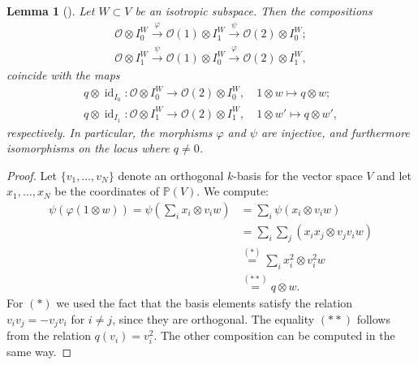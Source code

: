 \documentclass[a4paper, twoside, 11pt]{amsart}
\newtheorem{lemma}[theorem]{Lemma}
\theoremstyle{definition}
\theoremstyle{remark}
\numberwithin{equation}{theorem}
\DeclareMathOperator{\id}{id}
\begin{document}
\begin{lemma}[{\cite[§2]{Addington}}]\label{phi_and_psi_calc}
    Let $W\subset V$ be an isotropic subspace. Then the compositions 
    \begin{equation*}
    \begin{aligned}
    \mathcal{O} \otimes I_{0}^W \overset{\varphi}{\longrightarrow} \mathcal{O}(1) \otimes I_{1}^W \overset{\psi}{\longrightarrow} \mathcal{O}(2) \otimes I_{0}^W; \\
    \mathcal{O} \otimes I_{1}^W \overset{\psi}{\longrightarrow} \mathcal{O}(1) \otimes I_{0}^W \overset{\varphi}{\longrightarrow} \mathcal{O}(2) \otimes I_{1}^W,
    \end{aligned} 
    \end{equation*}
    coincide with the maps
    \begin{equation*}
    \begin{aligned}
         q \otimes \id_{I_0} \colon \mathcal{O} \otimes I_{0}^W \longrightarrow \mathcal{O}(2) \otimes I_{0}^W,\quad 1 \otimes w \mapsto q \otimes w; \\
         q \otimes \id_{I_1} \colon \mathcal{O} \otimes I_{1}^W \longrightarrow \mathcal{O}(2) \otimes I_{1}^W,\quad 1 \otimes w' \mapsto q \otimes w',
    \end{aligned}
    \end{equation*}
    respectively. In particular, the morphisms $\varphi$ and $\psi$ are injective, and furthermore isomorphisms on the locus where $q\neq 0$.
\end{lemma}
\iffalse 
\begin{proof}
Let $\{v_1,\dots,v_{N}\}$ denote an orthogonal $k$-basis for the vector space $V$ 
and let $x_1,\dots,x_{N}$ be the coordinates of $\mathbb{P}(V)$. We compute:
\begin{equation*}
\begin{aligned}
     \psi(\varphi(1\otimes w)) = \psi(\sum_ix_i\otimes v_iw) & = \sum_i\psi(x_i\otimes v_iw) \\
    & =\sum_i\sum_j(x_ix_j\otimes v_jv_iw) \\
    & \overset{(*)}{=} \sum_ix_i^2\otimes v_i^2w \\
    & \overset{(**)}{=} q \otimes w.
\end{aligned}
\end{equation*}
For $(*)$ we used the fact that the basis elements satisfy the relation $v_iv_j=-v_jv_i$ for $i\neq j$, since they are orthogonal. The equality $(**)$ follows from the relation $q(v_i) =v_i^2 $. The other composition can be computed in the same way. 
\end{proof}
\end{document}
